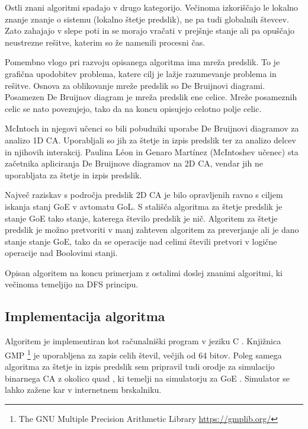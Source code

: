 \documentclass[12pt,a4paper,openany,twoside]{book}
\begin{document}
Ostli znani algoritmi spadajo v drugo kategorijo.
Večinoma izkoriščajo le lokalno znanje znanje o sistemu (lokalno štetje predslik),
ne pa tudi globalnih števcev.
Zato zahajajo v slepe poti in se morajo vračati v prejšnje stanje
ali pa opuščajo neustrezne rešitve, katerim so že namenili procesni čas.

Pomembno vlogo pri razvoju opisanega algoritma ima mreža predslik.
To je grafična upodobitev problema, katere cilj je lažje razumevanje problema in rešitve.
Osnova za oblikovanje mreže predslik so De Bruijnovi diagrami.
Posamezen De Bruijnov diagram je mreža predslik ene celice.
Mreže posameznih celic se nato povezujejo,
tako da na koncu opisujejo celotno polje celic.

McIntoch in njegovi učenci so bili pobudniki uporabe De Bruijnovi diagramov za analizo 1D CA.
Uporabljali so jih za štetje in izpis predslik ter za analizo delcev in njihovih interakcij.
Paulina Léon in Genaro Martínez (McIntoshev učenec) \cite{PaulinaGenaro2016}
sta začetnika apliciranja De Bruijnove diagramov na 2D CA,
vendar jih ne uporabljata za štetje in izpis predslik.

Največ raziskav s področja predslik 2D CA je bilo opravljenih ravno s ciljem iskanja stanj GoE v avtomatu GoL.
S stališča algoritma za štetje predslik je stanje GoE tako stanje, katerega število predslik je nič.
Algoritem za štetje predslik je možno pretvoriti v manj zahteven algoritem za preverjanje ali je dano stanje stanje GoE,
tako da se operacije nad celimi števili pretvori v logične operacije nad Boolovimi stanji.

Opisan algoritem na koncu primerjam z ostalimi doslej znanimi algoritmi,
ki večinoma temeljijo na DFS principu.

\subsection{Implementacija algoritma}

Algoritem je implementiran kot računalniški program v jeziku C \cite{Jeras2016-algirithm}.
Knjižnica GMP \footnote{The GNU Multiple Precision Arithmetic Library \url{https://gmplib.org/}}
je uporabljena za zapis celih števil, večjih od 64 bitov.
Poleg samega algoritma za štetje in izpis predslik sem pripravil tudi
orodje za simulacijo binarnega CA z okolico quad \cite{Jeras2016-quad},
ki temelji na simulatorju za GoE \cite{webgl-gol}.
Simulator se lahko zažene kar v internetnem brskalniku.
\end{document}
